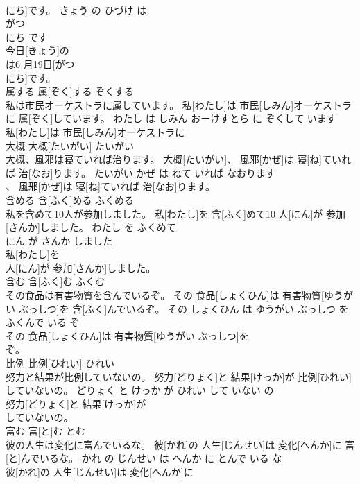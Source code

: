 \documentclass[8pt]{extreport}
\begin{document}
\begin{CJK}{UTF8}{min}
\\	にち]です。	きょう の ひづけ は 
\\	がつ 
\\	にち です	
\\	今日[きょう]の
\\	は6 月19日[がつ 
\\	にち]です。			
\\	属する	属[ぞく]する	ぞくする	
\\	私は市民オーケストラに属しています。	私[わたし]は 市民[しみん]オーケストラに 属[ぞく]しています。	わたし は しみん おーけすとら に ぞくして います	
\\	私[わたし]は 市民[しみん]オーケストラに
\\	大概	大概[たいがい]	たいがい	
\\	大概、風邪は寝ていれば治ります。	大概[たいがい]、 風邪[かぜ]は 寝[ね]ていれば 治[なお]ります。	たいがい かぜ は ねて いれば なおります	
\\	、 風邪[かぜ]は 寝[ね]ていれば 治[なお]ります。			
\\	含める	含[ふく]める	ふくめる	
\\	私を含めて10人が参加しました。	私[わたし]を 含[ふく]めて10 人[にん]が 参加[さんか]しました。	わたし を ふくめて 
\\	にん が さんか しました	
\\	私[わたし]を
\\	人[にん]が 参加[さんか]しました。			
\\	含む	含[ふく]む	ふくむ	
\\	その食品は有害物質を含んでいるぞ。	その 食品[しょくひん]は 有害物質[ゆうがい ぶっしつ]を 含[ふく]んでいるぞ。	その しょくひん は ゆうがい ぶっしつ を ふくんで いる ぞ	
\\	その 食品[しょくひん]は 有害物質[ゆうがい ぶっしつ]を
\\	ぞ。			
\\	比例	比例[ひれい]	ひれい	
\\	努力と結果が比例していないの。	努力[どりょく]と 結果[けっか]が 比例[ひれい]していないの。	どりょく と けっか が ひれい して いない の	
\\	努力[どりょく]と 結果[けっか]が
\\	していないの。			
\\	富む	富[と]む	とむ	
\\	彼の人生は変化に富んでいるな。	彼[かれ]の 人生[じんせい]は 変化[へんか]に 富[と]んでいるな。	かれ の じんせい は へんか に とんで いる な	
\\	彼[かれ]の 人生[じんせい]は 変化[へんか]に

\end{CJK}
\end{document}
